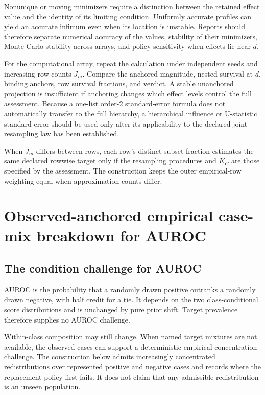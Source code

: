 \documentclass[11pt]{article}
\theoremstyle{remark}
\begin{document}
Nonunique or moving minimizers require a distinction between the retained
effect value and the identity of its limiting condition. Uniformly accurate
profiles can yield an accurate infimum even when its location is unstable.
Reports should therefore separate numerical accuracy of the values, stability
of their minimizers, Monte Carlo stability across arrays, and policy
sensitivity when effects lie near $d$.

For the computational array, repeat the calculation under independent seeds
and increasing row counts $J_m$. Compare the anchored magnitude, nested
survival at $d$, binding anchors, row survival fractions, and verdict. A stable
unanchored projection is insufficient if anchoring changes which effect levels
control the full assessment. Because a one-list order-2 standard-error formula
does not automatically transfer to the full hierarchy, a hierarchical
influence or U-statistic standard error should be used only after its
applicability to the declared joint resampling law has been established.

When $J_m$ differs between rows, each row's distinct-subset fraction estimates
the same declared rowwise target only if the resampling procedures and $K_C$
are those specified by the assessment. The construction keeps the outer
empirical-row weighting equal when approximation counts differ.


\section{Observed-anchored empirical case-mix breakdown for AUROC}
\label{app:auroc}

\subsection{The condition challenge for AUROC}

AUROC is the probability that a randomly drawn positive outranks a randomly
drawn negative, with half credit for a tie. It depends on the two
class-conditional score distributions and is unchanged by pure prior shift.
Target prevalence therefore supplies no AUROC challenge.

Within-class composition may still change. When named target mixtures are not
available, the observed cases can support a deterministic empirical
concentration challenge. The construction below admits increasingly
concentrated redistributions over represented positive and negative cases and
records where the replacement policy first fails. It does not claim that any
admissible redistribution is an unseen population.
\end{document}
